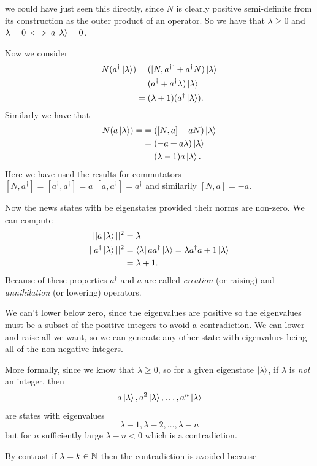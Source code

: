 \documentclass{article}
\begin{document}
we could have just seen this directly, since $ N $ is clearly positive semi-definite from its construction as the outer product of an operator. So we have that $ \lambda \ge 0  $ and $ \lambda = 0 \iff a\ket \lambda = 0 $.\par 
Now we consider
\begin{align*}
	N(a^\dagger \ket \lambda) & = ([N, a^\dagger] + a^\dagger N)\ket \lambda \\
				  &= ( a^\dagger + a^\dagger \lambda) \ket \lambda \\
				  &= (\lambda + 1) (a^\dagger \ket \lambda).
\end{align*}
Similarly we have that
\begin{align*}
	N(a\ket \lambda) = &= ([N,a] + aN)\ket \lambda\\
			   &= ( -a + a\lambda)\ket\lambda \\
			   &= (\lambda -1 ) a \ket \lambda.
\end{align*}
Here we have used the results for commutators $ [N,a^\dagger] = [a^\dagger, a^\dagger] = a^\dagger[a,a^\dagger] = a^\dagger $ and similarily $ [N, a] = -a $.
\par
Now the news states with be eigenstates provided their norms are non-zero. We can compute 
\begin{align*}
	||a\ket \lambda ||^2 &= \lambda\\
	||a^\dagger \ket \lambda ||^2 &= \bra \lambda aa^\dagger \ket \lambda = \lambda a^\dagger a + 1 \ket \lambda \\
			     &= \lambda + 1.
\end{align*}
Because of these properties $ a^\dagger $ and $ a $ are called \textit{creation} (or raising) and \textit{annihilation} (or lowering) operators.\par
We can't lower below zero, since the eigenvalues are positive so the eigenvalues must be a subset of the positive integers to avoid a contradiction. We can lower and raise all we want, so we can generate any other state with eigenvalues being all of the non-negative integers.\par
More formally, since we know that $ \lambda \ge 0  $, so for a given eigenstate $ \ket \lambda $, if $ \lambda $ is \textit{not} an integer, then
\[
  a\ket \lambda, a^2\ket\lambda, \dots, a^n\ket \lambda
\]
are states with eigenvalues
\[
  \lambda -1, \lambda -2, \dots, \lambda -n
\]
but for $ n $ sufficiently large $ \lambda - n <0 $ which is a contradiction.
\par
By contrast if $ \lambda =k \in \mathbb{N} $ then the contradiction is avoided because
\end{document}
